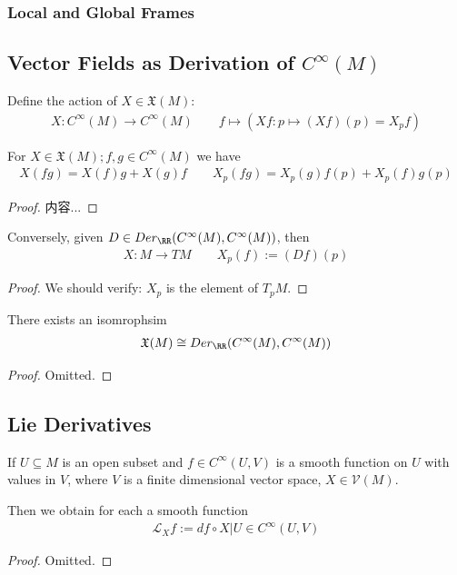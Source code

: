 \documentclass[Total.tex]{subfiles}
\begin{document}
			\subsubsection{Local and Global Frames}
		\subsection{Vector Fields as Derivation of $C^\infty(M)$}
			\begin{Def}
				Define the action of $X\in \mathfrak{X}(M)$:
				\begin{gather*}
					X:C^\infty(M)\rightarrow C^\infty(M)\qquad f\mapsto (Xf:p\mapsto (Xf)(p)=X_p f)
				\end{gather*}
			\end{Def}
			
			\begin{proposition}
				For $X\in \mathfrak{X}(M);f,g\in C^\infty(M)$ we have
				\begin{gather*}
					X(fg)=X(f)g+X(g)f\qquad X_p(fg)=X_p(g)f(p)+X_p(f)g(p)
				\end{gather*}
			\end{proposition}
			\begin{proof}
				内容...
			\end{proof}
			
			\begin{proposition}
				Conversely, given $D\in Der_\RR(C^\infty(M),C^\infty(M))$, then
				\begin{gather*}
					X:M\rightarrow TM\qquad X_p(f):=(Df)(p)
				\end{gather*}
			\end{proposition}
			\begin{proof}
				We should verify:  $X_p$ is the element of $T_p M$. 
			\end{proof}
			
			\begin{corollary}
				There exists an isomrophsim
				\begin{gather*}
					\mathfrak{X}(M)\cong Der_\RR(C^\infty(M),C^\infty(M))
				\end{gather*}
			\end{corollary}
			\begin{proof}
				Omitted.
			\end{proof}
		\subsection{Lie Derivatives}
			\begin{lemma}
				If $U\subseteq M$ is an open subset and $f\in C^\infty(U,V)$ is a smooth function on $U$ with values in $V$, where $V$ is a finite dimensional vector space, $X\in \mathcal{V}(M)$.
				
				Then we obtain for each a smooth function
				\begin{gather*}
					\mathcal{L}_X f:=df\circ X|U\in C^\infty(U,V)
				\end{gather*} 
			\end{lemma}
			\begin{proof}
				Omitted.
			\end{proof}
			
\end{document}
